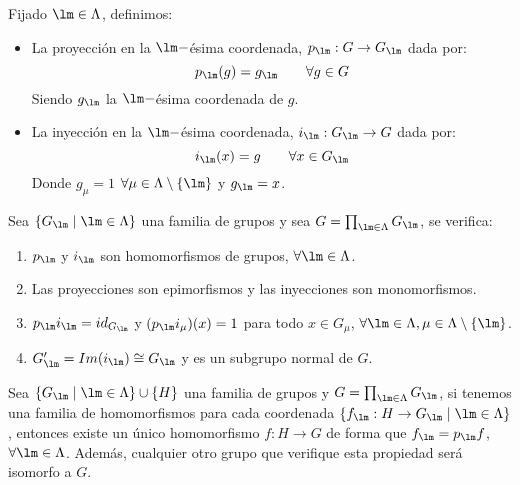 \begin{definicion}
    Fijado $\lm \in \Lambda$, definimos:
    \begin{itemize}
        \item La proyección en la $\lm-$ésima coordenada, $p_\lm:G\to G_\lm$ dada por:
            \begin{equation*}
                p_\lm(g) = g_\lm \qquad \forall g\in G
            \end{equation*}
            Siendo $g_\lm$ la $\lm-$ésima coordenada de $g$.
        \item La inyección en la $\lm-$ésima coordenada, $i_\lm:G_\lm\to G$ dada por:
            \begin{equation*}
                i_\lm(x) = g \qquad \forall x\in G_\lm
            \end{equation*}
            Donde $g_\mu = 1$ $\forall \mu\in \Lambda\setminus\{\lm\}$ y $g_\lm = x$.
    \end{itemize}
\end{definicion}

\begin{prop}
    Sea $\{G_\lm \mid \lm\in \Lambda\}$ una familia de grupos y sea $G=\prod_{\lm\in \Lambda}G_\lm$, se verifica:
    \begin{enumerate}
        \item $p_\lm$ y $i_\lm$ son homomorfismos de grupos, $\forall \lm\in \Lambda$.
        \item Las proyecciones son epimorfismos y las inyecciones son monomorfismos.
        \item $p_\lm i_\lm = id_{G_\lm}$ y $(p_\lm i_\mu)(x) = 1$ para todo $x\in G_\mu$, $\forall \lm\in \Lambda, \mu \in \Lambda\setminus\{\lm\}$.
        \item $G'_\lm = Im(i_\lm) \cong G_\lm$ y es un subgrupo normal de $G$.
    \end{enumerate}
\end{prop}

\begin{teo}
    Sea $\{G_\lm \mid \lm\in \Lambda\}\cup \{H\}$ una familia de grupos y $G=\prod_{\lm\in \Lambda}G_\lm$, si tenemos una familia de homomorfismos para cada coordenada $\{f_\lm :H\to G_\lm \mid \lm\in \Lambda\}$, entonces existe un único homomorfismo $f:H\to G$ de forma que $f_\lm = p_\lm f$, $\forall \lm\in \Lambda$. Además, cualquier otro grupo que verifique esta propiedad será isomorfo a $G$.

    \begin{figure}[H]
        \centering
    \end{figure}
\end{teo}

